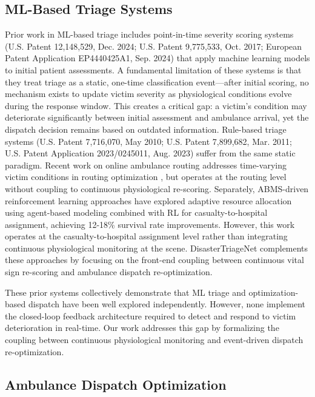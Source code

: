 \documentclass[conference]{IEEEtran}
\begin{document}
\subsection{ML-Based Triage Systems}

Prior work in ML-based triage includes point-in-time severity scoring systems (U.S. Patent 12,148,529, Dec. 2024; U.S. Patent 9,775,533, Oct. 2017; European Patent Application EP4440425A1, Sep. 2024) that apply machine learning models to initial patient assessments. A fundamental limitation of these systems is that they treat triage as a static, one-time classification event---after initial scoring, no mechanism exists to update victim severity as physiological conditions evolve during the response window. This creates a critical gap: a victim's condition may deteriorate significantly between initial assessment and ambulance arrival, yet the dispatch decision remains based on outdated information. Rule-based triage systems (U.S. Patent 7,716,070, May 2010; U.S. Patent 7,899,682, Mar. 2011; U.S. Patent Application 2023/0245011, Aug. 2023) suffer from the same static paradigm. Recent work on online ambulance routing addresses time-varying victim conditions in routing optimization \cite{shiri2024}, but operates at the routing level without coupling to continuous physiological re-scoring. Separately, ABMS-driven reinforcement learning approaches \cite{muratetu2025} have explored adaptive resource allocation using agent-based modeling combined with RL for casualty-to-hospital assignment, achieving 12-18\% survival rate improvements. However, this work operates at the casualty-to-hospital assignment level rather than integrating continuous physiological monitoring at the scene. DisasterTriageNet complements these approaches by focusing on the front-end coupling between continuous vital sign re-scoring and ambulance dispatch re-optimization.

These prior systems collectively demonstrate that ML triage and optimization-based dispatch have been well explored independently. However, none implement the closed-loop feedback architecture required to detect and respond to victim deterioration in real-time. Our work addresses this gap by formalizing the coupling between continuous physiological monitoring and event-driven dispatch re-optimization.

\subsection{Ambulance Dispatch Optimization}
\end{document}

